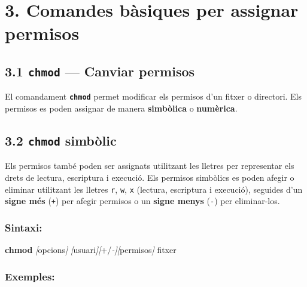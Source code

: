 \documentclass[
  a4paper,
]{article}
\newenvironment{Shaded}{\begin{snugshade}}{\end{snugshade}}
\newcommand{\FunctionTok}[1]{\textcolor[rgb]{0.13,0.29,0.53}{\textbf{#1}}}
\newcommand{\NormalTok}[1]{#1}
\newcommand{\PreprocessorTok}[1]{\textcolor[rgb]{0.56,0.35,0.01}{\textit{#1}}}
\newcommand{\SpecialStringTok}[1]{\textcolor[rgb]{0.31,0.60,0.02}{#1}}
\begin{document}
\section{3. Comandes bàsiques per assignar
permisos}\label{comandes-buxe0siques-per-assignar-permisos}

\subsection{\texorpdfstring{3.1 \texttt{chmod} --- Canviar
permisos}{3.1 chmod --- Canviar permisos}}\label{chmod-canviar-permisos}

El comandament \textbf{\texttt{chmod}} permet modificar els permisos
d'un fitxer o directori. Els permisos es poden assignar de manera
\textbf{simbòlica} o \textbf{numèrica}.

\subsection{\texorpdfstring{3.2 \texttt{chmod}
simbòlic}{3.2 chmod simbòlic}}\label{chmod-simbuxf2lic}

Els permisos també poden ser assignats utilitzant les lletres per
representar els drets de lectura, escriptura i execució. Els permisos
simbòlics es poden afegir o eliminar utilitzant les lletres \texttt{r},
\texttt{w}, \texttt{x} (lectura, escriptura i execució), seguides d'un
\textbf{signe més} (\texttt{+}) per afegir permisos o un \textbf{signe
menys} (\texttt{-}) per eliminar-los.

\subsubsection{Sintaxi:}\label{sintaxi}

\begin{Shaded}
\begin{Highlighting}[]
\FunctionTok{chmod} \PreprocessorTok{[}\SpecialStringTok{opcions}\PreprocessorTok{]} \PreprocessorTok{[}\SpecialStringTok{usuari}\PreprocessorTok{][}\SpecialStringTok{+/}\PreprocessorTok{{-}][}\SpecialStringTok{permisos}\PreprocessorTok{]}\NormalTok{ fitxer}
\end{Highlighting}
\end{Shaded}

\subsubsection{Exemples:}\label{exemples}
\end{document}
